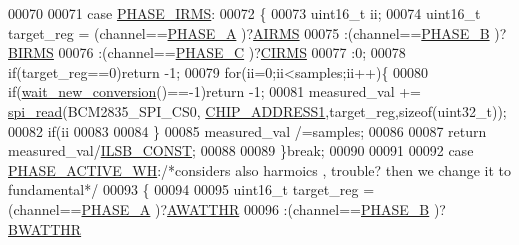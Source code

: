 \begin{DoxyCode}
00070 
00071                 \textcolor{keywordflow}{case}  \hyperlink{a00043_a15c9ccf287820001431c33c4bb25a23b}{PHASE\_IRMS}:
00072                 \{
00073                     uint16\_t ii;
00074                     uint16\_t target\_reg =  (channel==\hyperlink{a00043_ad214039f52b011ce2bd6c85ff98a981b}{PHASE\_A} )?\hyperlink{a00036_afae37e821d8947e31a63759e4bb57355}{AIRMS}
00075                                           :(channel==\hyperlink{a00043_ad7b96feed1e1c12515dad5e926b2c62e}{PHASE\_B} )?\hyperlink{a00036_ae1cff66a3f5c466b4344a5c2781224df}{BIRMS}
00076                                           :(channel==\hyperlink{a00043_a3ceb83fb10c2af19b468d508448f24e2}{PHASE\_C} )?\hyperlink{a00036_a3ccd0ef2a55b24f358292694724d37a3}{CIRMS}
00077                                           :0;
00078                     \textcolor{keywordflow}{if}(target\_reg==0)\textcolor{keywordflow}{return} -1;     
00079                     \textcolor{keywordflow}{for}(ii=0;ii<samples;ii++)\{
00080                     \textcolor{keywordflow}{if}(\hyperlink{a00003_ga7b6d584350762c53419945480d6958d3}{wait\_new\_conversion}()==-1)\textcolor{keywordflow}{return} -1;
00081                     measured\_val += \hyperlink{a00007_ga7ad9f65ee46aca507374096506a0b1c4}{spi\_read}(BCM2835\_SPI\_CS0,
      \hyperlink{a00037_a94de2b046db6e10257ef4481c0a15eaa}{CHIP\_ADDRESS1},target\_reg,\textcolor{keyword}{sizeof}(uint32\_t)); 
00082                     \textcolor{keywordflow}{if}(ii%
00083                     
00084                     \}
00085                     measured\_val /=samples;
00086                     
00087                     \textcolor{keywordflow}{return} measured\_val/\hyperlink{a00037_a88b595bff6a462c91ddc1cafbd6e4140}{ILSB\_CONST};
00088                 
00089                 \}\textcolor{keywordflow}{break};
00090                 
00091                 
00092                 \textcolor{keywordflow}{case}  \hyperlink{a00043_a4ee773ad07fa969b9990f9bb3a1a2093}{PHASE\_ACTIVE\_WH}:\textcolor{comment}{/*considers also harmoics , trouble? then we change it
       to fundamental*/}
00093                 \{
00094             
00095                     uint16\_t target\_reg =  (channel==\hyperlink{a00043_ad214039f52b011ce2bd6c85ff98a981b}{PHASE\_A} )?\hyperlink{a00036_ae66c97ed86f47fd938f143a30a8b2f7e}{AWATTHR}
00096                                           :(channel==\hyperlink{a00043_ad7b96feed1e1c12515dad5e926b2c62e}{PHASE\_B} )?\hyperlink{a00036_a185c6910fa47f7e973f0f8743ef0e8ad}{BWATTHR}

\end{DoxyCode}
